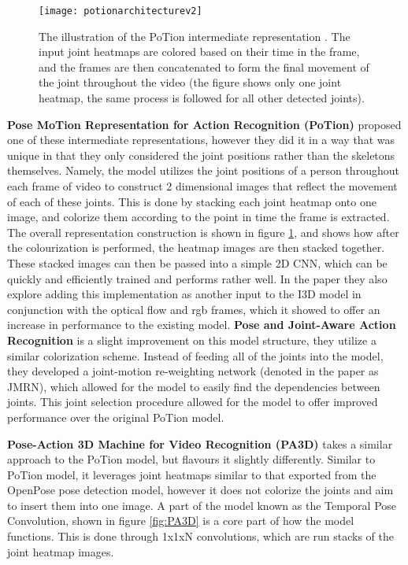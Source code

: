 \begin{figure}[ht]
	\texttt{[image: potionarchitecturev2]}
	\centering
	\caption{The illustration of the PoTion intermediate representation \cite{potion}. The input joint heatmaps are colored based on their time in the frame, and the frames are then concatenated to form the final movement of the joint throughout the video (the figure shows only one joint heatmap, the same process is followed for all other detected joints).}
	\label{fig:potion-architecture}
\end{figure}

\textbf{Pose MoTion Representation for Action Recognition (PoTion)} \cite{potion} proposed one of these intermediate representations, however they did it in a way that was unique in that they only considered the joint positions rather than the skeletons themselves. Namely, the model utilizes the joint positions of a person throughout each frame of video to construct 2 dimensional images that reflect the movement of each of these joints. This is done by stacking each joint heatmap onto one image, and colorize them according to the point in time the frame is extracted.  The overall representation construction is shown in figure \ref{fig:potion-architecture}, and shows how after the colourization is performed, the heatmap images are then stacked together. These stacked images can then be passed into a simple 2D CNN, which can be quickly and efficiently trained and performs rather well. In the paper they also explore adding this implementation as another input to the I3D \cite{i3d} model in conjunction with the optical flow and rgb frames, which it showed to offer an increase in performance to the existing model. \textbf{Pose and Joint-Aware Action Recognition} \cite{poseandjointaware} is a slight improvement on this model structure, they utilize a similar colorization scheme. Instead of feeding all of the joints into the model, they developed a joint-motion re-weighting network (denoted in the paper as JMRN), which allowed for the model to easily find the dependencies between joints. This joint selection procedure allowed for the model to offer improved performance over the original PoTion model.

\textbf{Pose-Action 3D Machine for Video Recognition (PA3D)} \cite{PA3D} takes a similar approach to the PoTion model, but flavours it slightly differently. Similar to PoTion model, it leverages joint heatmaps similar to that exported from the OpenPose pose detection model, however it does not colorize the joints and aim to insert them into one image. A part of the model known as the Temporal Pose Convolution, shown in figure \ref{fig:PA3D} is a core part of how the model functions. This is done through 1x1xN convolutions, which are run stacks of the joint heatmap images.

